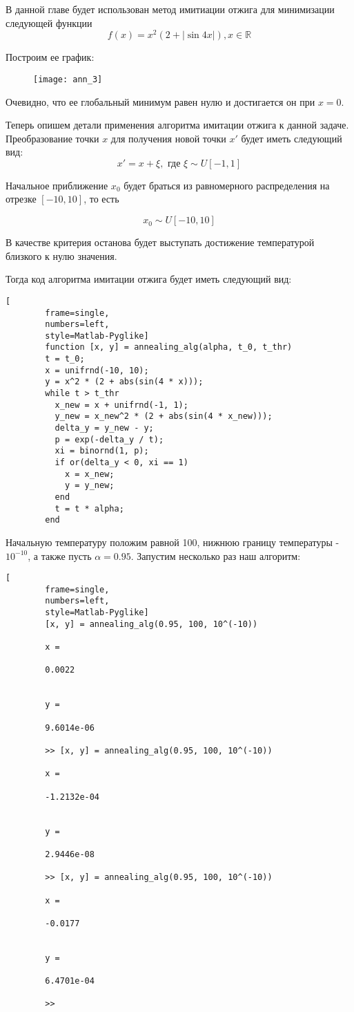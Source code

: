 \documentclass[../main.tex]{subfiles}
\begin{document}
	В данной главе будет использован метод имитиации отжига для минимизации следующей функции
	\[f(x) = x^2 (2 + |\sin4x|), x \in \mathbb{R}\]
	
	Построим ее график:
	\begin{figure}[H]
		\texttt{[image: ann\_3]}
	\end{figure}
	
	
	
	Очевидно, что ее глобальный минимум равен нулю и достигается он при $x=0$. 
	
	Теперь опишем детали применения алгоритма имитации отжига к данной задаче. Преобразование точки $x$ для получения новой точки $x'$ будет иметь следующий вид:
	\[x' = x + \xi, \text{ где }\xi \sim U[-1, 1]\]
	
	Начальное приближение $x_0$ будет браться из равномерного распределения на отрезке $[-10, 10]$, то есть
	
	\[x_0 \sim U[-10, 10]\]
	
	В качестве критерия останова будет выступать достижение температурой близкого к нулю значения. 
	
	Тогда код алгоритма имитации отжига будет иметь следующий вид:
	
	\begin{lstlisting}[
		frame=single,
		numbers=left,
		style=Matlab-Pyglike]
		function [x, y] = annealing_alg(alpha, t_0, t_thr)
		t = t_0;
		x = unifrnd(-10, 10);
		y = x^2 * (2 + abs(sin(4 * x)));
		while t > t_thr
		  x_new = x + unifrnd(-1, 1);
		  y_new = x_new^2 * (2 + abs(sin(4 * x_new)));
		  delta_y = y_new - y;
		  p = exp(-delta_y / t);
		  xi = binornd(1, p);
		  if or(delta_y < 0, xi == 1)
		    x = x_new;
		    y = y_new;
		  end
		  t = t * alpha;
		end
	\end{lstlisting}
	
	Начальную температуру положим равной 100, нижнюю границу температуры - $10^{-10}$, а также пусть $\alpha=0.95$. Запустим несколько раз наш алгоритм:
	
	\begin{lstlisting}[
		frame=single,
		numbers=left,
		style=Matlab-Pyglike]
		[x, y] = annealing_alg(0.95, 100, 10^(-10))
		
		x =
		
		0.0022
		
		
		y =
		
		9.6014e-06
		
		>> [x, y] = annealing_alg(0.95, 100, 10^(-10))
		
		x =
		
		-1.2132e-04
		
		
		y =
		
		2.9446e-08
		
		>> [x, y] = annealing_alg(0.95, 100, 10^(-10))
		
		x =
		
		-0.0177
		
		
		y =
		
		6.4701e-04
		
		>> 
	\end{lstlisting}
	
\end{document}

